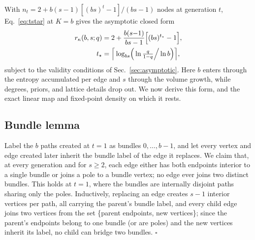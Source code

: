 \documentclass[preprint,12pt]{elsarticle}
\newcommand{\rk}{r_{\kappa}}
\begin{document}
With $n_t=2+b(s{-}1)[(bs)^t{-}1]/(bs{-}1)$ nodes at generation $t$,
Eq.~\eqref{eq:tstar} at $K=b$ gives the asymptotic closed form
\begin{align}
  \rk(b,s;q) &= 2+\frac{b(s{-}1)}{bs-1}\Big[(bs)^{t_\star}-1\Big],
  \label{eq:rkbs}\\
  t_\star &= \Big\lceil \log_{bs}\!\Big(\ln\tfrac{q}{1-q}\Big/\ln b\Big)
  \Big\rceil ,\notag
\end{align}
subject to the validity conditions of Sec.~\ref{sec:asymptotic}. Here $b$
enters through the entropy accumulated per edge and $s$ through the volume
growth, while degrees, priors, and lattice details drop out. We now derive this
form, and the exact linear map and fixed-point density on which it rests.

\subsection{Bundle lemma}
Label the $b$ paths created at $t=1$ as bundles
$0,\dots,b{-}1$, and let every vertex and edge created later inherit the
bundle label of the edge it replaces. We claim that, at every generation and
for $s\ge2$, each edge either has both endpoints interior to a single bundle
or joins a pole to a bundle vertex; no edge ever joins two distinct bundles.
This holds at $t=1$, where the bundles are internally disjoint paths sharing
only the poles. Inductively, replacing an edge creates $s\!-\!1$ interior
vertices per path, all carrying the parent's bundle label, and every child
edge joins two vertices from the set \{parent endpoints, new vertices\}; since
the parent's endpoints belong to one bundle (or are poles) and the new
vertices inherit its label, no child can bridge two bundles. $\square$
\end{document}
